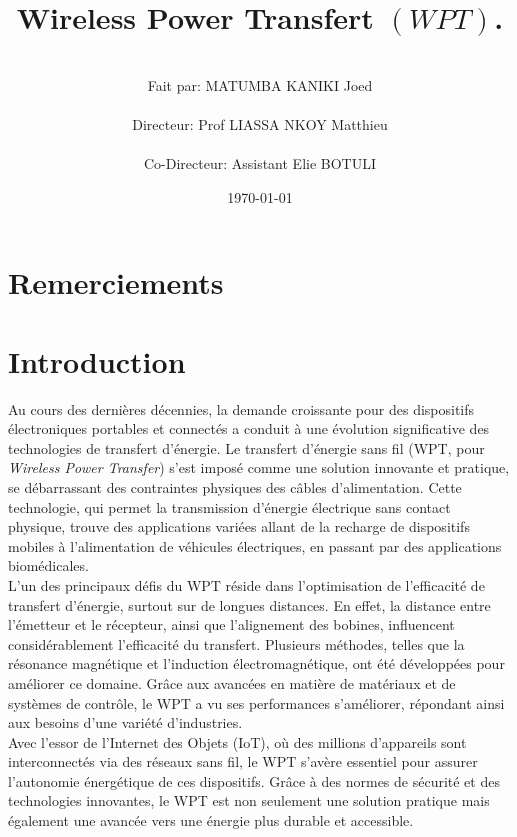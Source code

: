 \documentclass[12pt,a4paper,titlepage,notitlepage]{article}
\title{\textbf{Wireless Power Transfert} $\left( WPT\right)$. \vspace{5cm}}
\author{ \ \\Fait par: MATUMBA KANIKI Joed\\ \ \\ Directeur: Prof LIASSA NKOY Matthieu\\ \ \\ Co-Directeur: Assistant Elie BOTULI \\ }
\date{\vfill \today }
\begin{document}
	\maketitle
	\newpage
	\tableofcontents
	
	\newpage
	\section*{Remerciements}
	\newpage
	
	\vspace{2cm}
	\section{Introduction}	
	\vspace{1cm}	
	Au cours des dernières décennies, la demande croissante pour des dispositifs électroniques portables et connectés a conduit à une évolution significative des technologies de transfert d'énergie. Le transfert d'énergie sans fil (WPT, pour \emph{Wireless Power Transfer}) s'est imposé comme une solution innovante et pratique, se débarrassant des contraintes physiques des câbles d'alimentation. Cette technologie, qui permet la transmission d'énergie électrique sans contact physique, trouve des applications variées allant de la recharge de dispositifs mobiles à l'alimentation de véhicules électriques, en passant par des applications biomédicales.\\
	
	L'un des principaux défis du WPT réside dans l'optimisation de l'efficacité de transfert d'énergie, surtout sur de longues distances. En effet, la distance entre l'émetteur et le récepteur, ainsi que l'alignement des bobines, influencent considérablement l'efficacité du transfert. Plusieurs méthodes, telles que la résonance magnétique et l'induction électromagnétique, ont été développées pour améliorer ce domaine. Grâce aux avancées en matière de matériaux et de systèmes de contrôle, le WPT a vu ses performances s'améliorer, répondant ainsi aux besoins d'une variété d'industries.\\
	
	
	Avec l'essor de l'Internet des Objets (IoT), où des millions d'appareils sont interconnectés via des réseaux sans fil, le WPT s'avère essentiel pour assurer l'autonomie énergétique de ces dispositifs. Grâce à des normes de sécurité et des technologies innovantes, le WPT est non seulement une solution pratique mais également une avancée vers une énergie plus durable et accessible.\\
	
\end{document}
